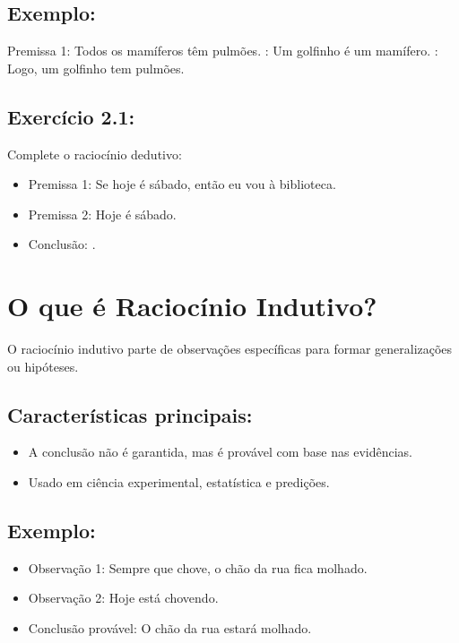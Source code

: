 \documentclass[a4paper,12pt]{book}
\begin{document}
\subsection*{Exemplo:}

Premissa 1: Todos os mamíferos têm pulmões.  : Um golfinho é um mamífero.  : Logo, um golfinho tem pulmões.

\subsection*{Exercício 2.1:}

Complete o raciocínio dedutivo:\begin{itemize}
\item Premissa 1: Se hoje é sábado, então eu vou à biblioteca.
\item Premissa 2: Hoje é sábado.
\item Conclusão: \underline{\hspace{5cm}}.
\end{itemize}

\section{O que é Raciocínio Indutivo?}

O raciocínio indutivo parte de observações específicas para formar generalizações ou hipóteses.

\subsection*{Características principais:}

\begin{itemize}
\item A conclusão não é garantida, mas é provável com base nas evidências.
\item Usado em ciência experimental, estatística e predições.
\end{itemize}

\subsection*{Exemplo:}
\begin{itemize}
\item Observação 1: Sempre que chove, o chão da rua fica molhado.  
\item Observação 2: Hoje está chovendo.  
\item Conclusão provável: O chão da rua estará molhado.
\end{itemize}
\end{document}

